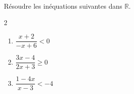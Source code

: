 \begin{exo}{}
	Résoudre les inéquations suivantes dans $\mathbb{R}$.
	\vspace*{-2mm}\begin{multicols}{2}
		\begin{enumerate}[itemsep=2mm]
			\item $\dfrac{x + 2}{-x + 6} < 0$
			\item $\dfrac{3x - 4}{2x + 3} \geqslant 0$
			\item $\dfrac{1 - 4x}{x - 3} < -4$
		\end{enumerate}
	\end{multicols}\vspace*{-2mm}
\end{exo}
